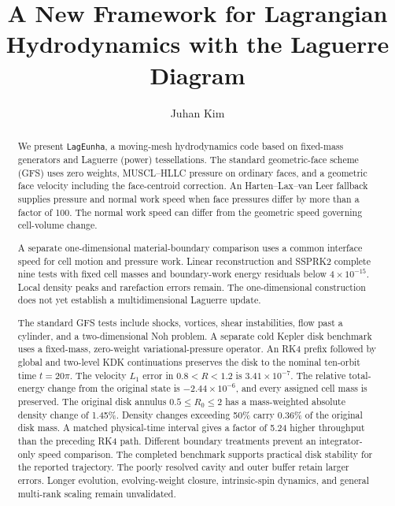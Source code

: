 \documentclass[twocolumn]{aastex63}
\newcommand{\lageunha}{\texttt{LagEunha}}
\begin{document}
\title{A New Framework for Lagrangian Hydrodynamics with the Laguerre Diagram}
\author[0000-0002-4391-2275]{Juhan Kim}




\begin{abstract}
We present \lageunha, a moving-mesh hydrodynamics code based on fixed-mass
generators and Laguerre (power) tessellations. The standard geometric-face
scheme (GFS) uses zero weights, MUSCL--HLLC pressure on ordinary faces, and a
geometric face velocity including the face-centroid correction. An
Harten--Lax--van Leer fallback supplies pressure and normal work speed
when face pressures differ by more than a factor of 100. The normal work
speed can differ from the geometric speed governing cell-volume change.

A separate one-dimensional material-boundary comparison uses a common
interface speed for cell motion and pressure work. Linear reconstruction
and SSPRK2 complete nine tests with fixed cell masses and boundary-work
energy residuals below $4\times10^{-15}$. Local density peaks and
rarefaction errors remain. The one-dimensional construction does not yet
establish a multidimensional Laguerre update.

The standard GFS tests include shocks, vortices, shear instabilities,
flow past a cylinder, and a two-dimensional Noh problem. A separate cold
Kepler disk benchmark uses a fixed-mass, zero-weight variational-pressure
operator. An RK4 prefix followed by global and two-level KDK continuations
preserves the disk to the nominal ten-orbit time $t=20\pi$. The velocity
$L_1$ error in $0.8<R<1.2$ is $3.41\times10^{-7}$. The relative
total-energy change from the original state is $-2.44\times10^{-6}$,
and every assigned cell mass is preserved. The original disk annulus
$0.5\le R_0\le2$ has a mass-weighted absolute density change of 1.45\%.
Density changes exceeding 50\% carry
0.36\% of the original disk mass. A matched physical-time interval gives
a factor of 5.24 higher throughput than the preceding RK4 path.
Different boundary treatments prevent an integrator-only speed comparison.
The completed benchmark supports practical disk stability for the reported
trajectory. The poorly resolved cavity and outer buffer retain larger errors.
Longer evolution, evolving-weight closure, intrinsic-spin
dynamics, and general multi-rank scaling remain unvalidated.
\end{abstract}
\end{document}
